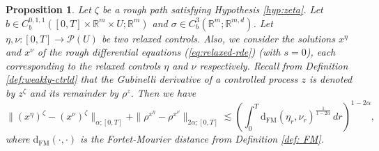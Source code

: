 \documentclass[12pt,reqno]{amsart}
\numberwithin{equation}{section}  %
\newcommand{\1}{{\bf 1}}
\newcommand{\2}{{\bf 2}}
\newcommand{\R}{\mathbb R}
\newcommand{\lp}{\left(}
\newcommand{\rp}{\right)}
\newtheorem{proposition}[theorem]{Proposition}
\theoremstyle{remark}
\theoremstyle{remark}
\begin{document}
\begin{proposition}\label{prop: variant-AC}
   Let $\zeta$ be a rough path satisfying Hypothesis \ref{hyp:zeta}. Let $b\in C_{b}^{0,1,1}([0,T]\times \R^m \times U;\R^m)$ and $\sigma\in C^{3}_{b}(\R^{m};\R^{m,d})$. Let $\eta,\nu\colon[0,T]\to\mathcal{P}(U)$ be two relaxed controls. Also, we consider the solutions $x^{\eta}$ and $x^{\nu}$ of the rough differential equations (\ref{eq:relaxed-rde}) (with $s=0$), each corresponding to the relaxed controls $\eta$ and $\nu$ respectively. Recall from Definition \ref{def:weakly-ctrld} that the Gubinelli derivative of a controlled process $z$ is denoted by $z^{\zeta}$ and its remainder by $\rho^{z}$. Then we have
   \begin{equation}\label{eq: est-beta}
       \|(x^{\eta})^{\zeta}-({x}^{\nu})^{\zeta}\|_{\alpha;[0,T]}+\|\rho^{x^{\eta}}-\rho^{{x}^{\nu}}\|_{2\alpha;[0,T]}\lesssim \lp \int_{0}^{T}\mathrm{d_{FM}}(\eta_{r},\nu_{r})^{\frac{1}{1-2\alpha}}\,dr \rp^{1-2\alpha},
   \end{equation}
   where $\mathrm{d_{FM}}(\cdot,\cdot)$ is the Fortet-Mourier distance from Definition \ref{def: FM}.
\end{proposition}
\end{document}
